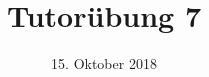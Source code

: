 %
% 
% 
%







\newcommand{\Datum}{\today}

\renewcommand{\PraesentationFusszeileZusatz}{| Tutorium Grundlagen: Datenbanken WS 18/19}

\title{Tutorübung 7}
\author{\PersonVorname{} \PersonNachname}
\institute[]{\UniversitaetName \\ \FakultaetName}
\date[\Datum]{15. Oktober 2018}



\setlength{\baselineskip}{\PraesentationAbstandAbsatz}
\setlength{\parskip}{\baselineskip}

\PraesentationMasterStandard

\PraesentationTitelseite %


